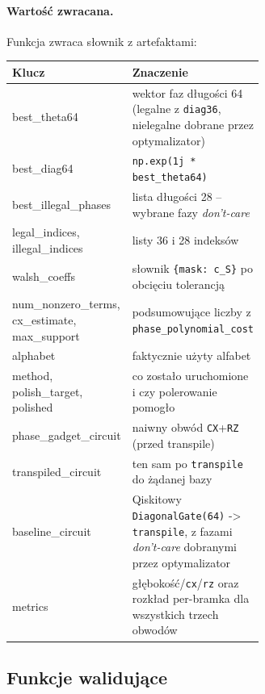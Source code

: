 \documentclass[11pt,a4paper]{article}
\newcommand{\1}{\mathbf{1}}
\newcommand{\code}[1]{\texttt{#1}}
\begin{document}
\paragraph{Wartość zwracana.}
Funkcja zwraca słownik z artefaktami:

\begin{center}
\begin{tabular}{>{\ttfamily}l p{0.62\linewidth}}
\toprule
\rmfamily\textbf{Klucz} & \textbf{Znaczenie}\\
\midrule
best\_theta64           & wektor faz długości 64 (legalne z \code{diag36},
                          nielegalne dobrane przez optymalizator)\\
best\_diag64            & \code{np.exp(1j * best\_theta64)}\\
best\_illegal\_phases   & lista długości 28 -- wybrane fazy \emph{don't-care}\\
legal\_indices,
illegal\_indices        & listy 36 i 28 indeksów\\
walsh\_coeffs           & słownik \code{\{mask: c\_S\}} po obcięciu tolerancją\\
num\_nonzero\_terms,
cx\_estimate,
max\_support            & podsumowujące liczby z \code{phase\_polynomial\_cost}\\
alphabet                & faktycznie użyty alfabet\\
method,
polish\_target,
polished                & co zostało uruchomione i czy polerowanie pomogło\\
phase\_gadget\_circuit  & naiwny obwód \code{CX}+\code{RZ} (przed transpile)\\
transpiled\_circuit     & ten sam po \code{transpile} do żądanej bazy\\
baseline\_circuit       & Qiskitowy \code{DiagonalGate(64)} -> \code{transpile},
                          z fazami \emph{don't-care} dobranymi przez optymalizator\\
metrics                 & głębokość/\code{cx}/\code{rz} oraz rozkład
                          per-bramka dla wszystkich trzech obwodów\\
\bottomrule
\end{tabular}
\end{center}

\subsection{Funkcje walidujące}
\label{sec:validate}
\end{document}
